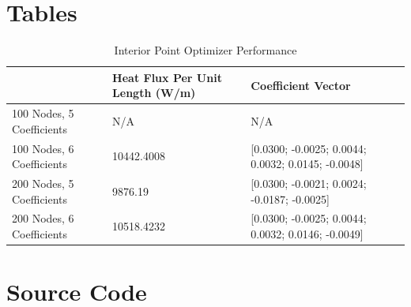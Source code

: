 \documentclass{article}
\begin{document}
 




\onecolumn

\section{Tables}

\begin{table}[h]
\centering
\caption{Interior Point Optimizer Performance}
\label{tab:ipopt}
\begin{tabular}{|l|l|l|}
\hline
                          & Heat Flux Per Unit Length (W/m) & Coefficient Vector                                     \\ \hline
100 Nodes, 5 Coefficients & N/A                             & N/A                                                    \\
100 Nodes, 6 Coefficients & 10442.4008                      & {[}0.0300; -0.0025; 0.0044; 0.0032; 0.0145; -0.0048{]} \\
200 Nodes, 5 Coefficients & 9876.19                         & {[}0.0300; -0.0021; 0.0024; -0.0187; -0.0025{]}        \\
200 Nodes, 6 Coefficients & 10518.4232                      & {[}0.0300; -0.0025; 0.0044; 0.0032; 0.0146; -0.0049{]} \\ \hline
\end{tabular}
\end{table}

\section{Source Code}

\end{document}

